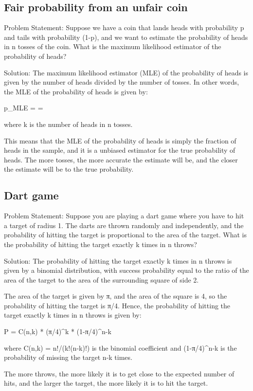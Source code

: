 \documentclass[12pt, a4paper, oneside]{article}
\begin{document}
\subsection{ Fair probability from an unfair coin }
Problem Statement:
Suppose we have a coin that lands heads with probability p and tails with probability (1-p), and we want to estimate the probability of heads in n tosses of the coin. What is the maximum likelihood estimator of the probability of heads?

Solution:
The maximum likelihood estimator (MLE) of the probability of heads is given by the number of heads divided by the number of tosses. In other words, the MLE of the probability of heads is given by:

p_{MLE} =  = 

where k is the number of heads in n tosses.

This means that the MLE of the probability of heads is simply the fraction of heads in the sample, and it is a unbiased estimator for the true probability of heads. The more tosses, the more accurate the estimate will be, and the closer the estimate will be to the true probability.
\subsection{ Dart game }
Problem Statement:
Suppose you are playing a dart game where you have to hit a target of radius 1. The darts are thrown randomly and independently, and the probability of hitting the target is proportional to the area of the target. What is the probability of hitting the target exactly k times in n throws?

Solution:
The probability of hitting the target exactly k times in n throws is given by a binomial distribution, with success probability equal to the ratio of the area of the target to the area of the surrounding square of side 2.

The area of the target is given by π, and the area of the square is 4, so the probability of hitting the target is π/4. Hence, the probability of hitting the target exactly k times in n throws is given by:

P = C(n,k) * (π/4)^k * (1-π/4)^{n-k}

where C(n,k) = n!/(k!(n-k)!) is the binomial coefficient and (1-π/4)^{n-k} is the probability of missing the target n-k times.

The more throws, the more likely it is to get close to the expected number of hits, and the larger the target, the more likely it is to hit the target.
\end{document}
